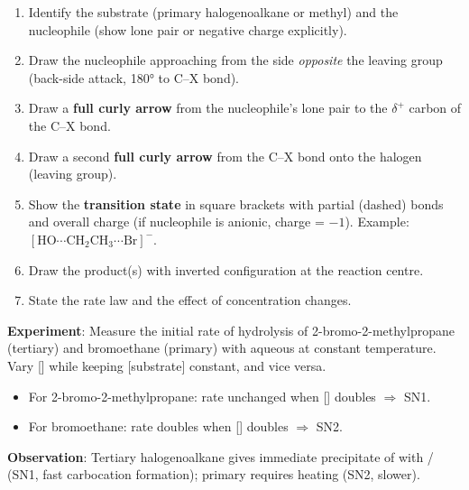 \documentclass[11pt]{article}
\begin{document}
\begin{methode}
\begin{enumerate}
\item Identify the substrate (primary halogenoalkane or methyl) and the nucleophile (show lone pair or negative charge explicitly).
\item Draw the nucleophile approaching from the side \emph{opposite} the leaving group (back-side attack, 180° to C–X bond).
\item Draw a \textbf{full curly arrow} from the nucleophile's lone pair to the $\delta^+$ carbon of the C–X bond.
\item Draw a second \textbf{full curly arrow} from the C–X bond onto the halogen (leaving group).
\item Show the \textbf{transition state} in square brackets with partial (dashed) bonds and overall charge (if nucleophile is anionic, charge = $-1$). Example: $\ensuremath{\mathrm{[HO\cdots CH_{2}CH_{3}\cdots Br]^{-}}}$.
\item Draw the product(s) with inverted configuration at the reaction centre.
\item State the rate law and the effect of concentration changes.
\end{enumerate}
\end{methode}

\begin{experience}
\textbf{Experiment}: Measure the initial rate of hydrolysis of 2-bromo-2-methylpropane (tertiary) and bromoethane (primary) with aqueous  at constant temperature. Vary [] while keeping [substrate] constant, and vice versa.
\begin{itemize}
\item For 2-bromo-2-methylpropane: rate unchanged when [] doubles $\Rightarrow$ SN1.
\item For bromoethane: rate doubles when [] doubles $\Rightarrow$ SN2.
\end{itemize}
\textbf{Observation}: Tertiary halogenoalkane gives immediate precipitate of  with / (SN1, fast carbocation formation); primary requires heating (SN2, slower).
\end{experience}
\end{document}
